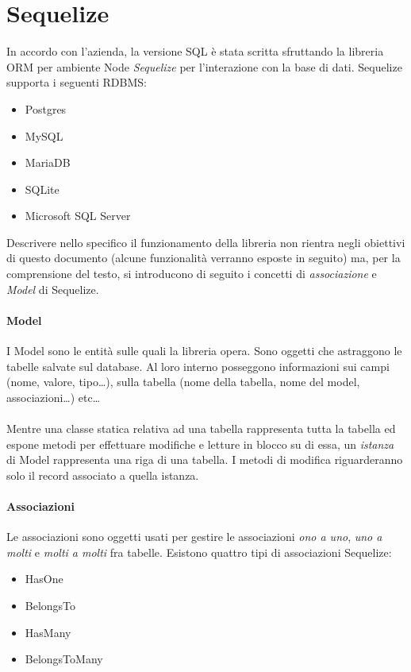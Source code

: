\documentclass[a4paper, 12pt]{report}
\begin{document}
    \section{Sequelize}
      In accordo con l'azienda, la versione SQL è stata scritta sfruttando la libreria ORM per ambiente Node \emph{Sequelize} per l'interazione con la base di dati.
      Sequelize supporta i seguenti RDBMS:
      \begin{itemize}
        \item Postgres
        \item MySQL
        \item MariaDB
        \item SQLite
        \item Microsoft SQL Server
      \end{itemize}
      Descrivere nello specifico il funzionamento della libreria non rientra negli obiettivi di questo documento (alcune funzionalità verranno esposte in seguito) ma, per la comprensione del testo, si introducono di seguito i concetti di \emph{associazione}  e \emph{Model} di Sequelize.
      \paragraph*{Model} 
      I Model sono le entità sulle quali la libreria opera. Sono oggetti che astraggono le tabelle salvate sul database.
      Al loro interno posseggono informazioni sui campi (nome, valore, tipo\dots), sulla tabella (nome della tabella, nome del model, associazioni\dots) etc\dots
      \paragraph*{}
      Mentre una classe statica relativa ad una tabella rappresenta tutta la tabella ed espone metodi per effettuare modifiche e letture in blocco su di essa, un \emph{istanza} di Model rappresenta una riga di una tabella.
      I metodi di modifica riguarderanno solo il record associato a quella istanza.
      \paragraph*{Associazioni}
      Le associazioni sono oggetti usati per gestire le associazioni \emph{ono a uno}, \emph{uno a molti} e \emph{molti a molti} fra tabelle.
      Esistono quattro tipi di associazioni Sequelize:
      \begin{itemize}
        \item HasOne
        \item BelongsTo
        \item HasMany
        \item BelongsToMany
      \end{itemize}
\end{document}
